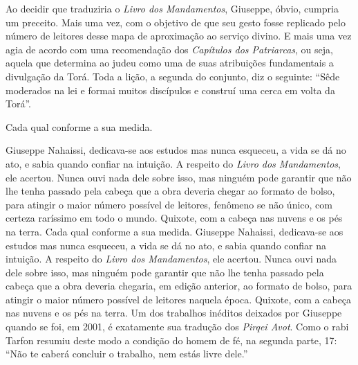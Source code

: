 Ao decidir que traduziria o \emph{Livro dos Mandamentos}, Giuseppe,
óbvio, cumpria um preceito. Mais uma vez, com o objetivo de que seu
gesto fosse replicado pelo número de leitores desse mapa de aproximação
ao serviço divino. E mais uma vez agia de acordo com uma recomendação
dos \emph{Capítulos dos Patriarcas}, ou seja, aquela que determina ao
judeu como uma de suas atribuições fundamentais a divulgação da Torá.
Toda a lição, a segunda do conjunto, diz o seguinte: ``Sêde moderados na
lei e formai muitos discípulos e construí uma cerca em volta da Torá''.

Cada qual conforme a sua medida.

Giuseppe Nahaissi, dedicava-se aos estudos mas nunca esqueceu, a vida se
dá no ato, e sabia quando confiar na intuição. A respeito do \emph{Livro
dos Mandamentos}, ele acertou. Nunca ouvi nada dele sobre isso, mas
ninguém pode garantir que não lhe tenha passado pela cabeça que a obra
deveria chegar ao formato de bolso, para atingir o maior número possível
de leitores, fenômeno se não único, com certeza raríssimo em todo o
mundo. Quixote, com a cabeça nas nuvens e os pés na terra. Cada qual
conforme a sua medida. Giuseppe Nahaissi, dedicava-se aos estudos mas
nunca esqueceu, a vida se dá no ato, e sabia quando confiar na intuição.
A respeito do \emph{Livro dos Mandamentos}, ele acertou. Nunca ouvi nada
dele sobre isso, mas ninguém pode garantir que não lhe tenha passado
pela cabeça que a obra deveria chegaria, em edição anterior, ao formato
de bolso, para atingir o maior número possível de leitores naquela
época. Quixote, com a cabeça nas nuvens e os pés na terra. Um dos
trabalhos inéditos deixados por Giuseppe quando se foi, em 2001, é
exatamente sua tradução dos \emph{Pirqei Avot}. Como o rabi Tarfon
resumiu deste modo a condição do homem de fé, na segunda parte, 17:
``Não te caberá concluir o trabalho, nem estás livre dele.''

